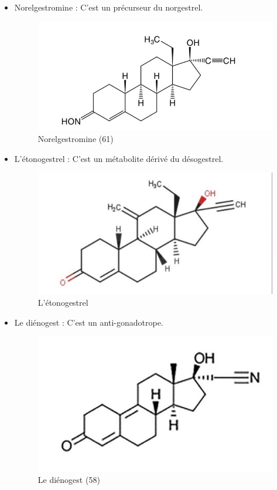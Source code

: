 \begin{itemize}[label={$\bullet$}, align=right]
  \item Norelgestromine : C’est un précurseur du norgestrel. 
  \begin{figure}[H]
    \centering
    \includegraphics{Images/fig_32.jpg}
    \caption{Norelgestromine (61)}
  \end{figure}
  \item L’étonogestrel : C’est un métabolite dérivé du désogestrel. 
  \begin{figure}[H]
    \centering
    \includegraphics{Images/fig_33.jpg}
    \caption{L’étonogestrel }
  \end{figure}
  \item Le diénogest : C’est un anti-gonadotrope.  
  \begin{figure}[H]
    \centering
    \includegraphics{Images/fig_34.jpg}    
    \caption{Le diénogest (58)}
  \end{figure}


\end{itemize}
